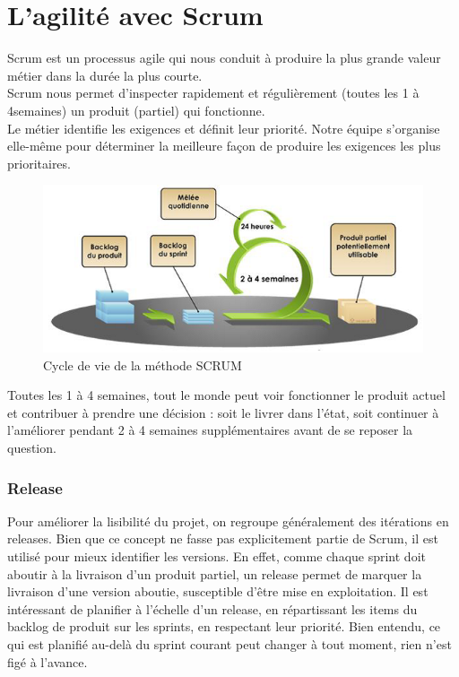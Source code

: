 \section{L’agilité avec Scrum}
Scrum est un processus agile qui nous conduit à produire la plus grande valeur métier dans la durée la plus courte.\\
Scrum nous permet d’inspecter rapidement et régulièrement (toutes les 1 à 4semaines) un produit
(partiel) qui fonctionne.\\
Le métier identifie les exigences et définit leur priorité. Notre équipe s’organise elle-même pour déterminer
la meilleure façon de produire les exigences les plus prioritaires.
\begin{figure}[h!]  
 \centering
    \includegraphics{annexe/Figures/scrum.png}
  \caption{Cycle de vie de la méthode SCRUM}
\end{figure}

Toutes les 1 à 4 semaines, tout le monde peut voir fonctionner le produit actuel et contribuer
à prendre une décision : soit le livrer dans l’état, soit continuer à l’améliorer pendant 2 à 4 semaines
supplémentaires avant de se reposer la question.\\

\subsubsection*{Release}
Pour améliorer la lisibilité du projet, on regroupe généralement des itérations en releases.
Bien que ce concept ne fasse pas explicitement partie de Scrum, il est utilisé pour mieux identifier
les versions. En effet, comme chaque sprint doit aboutir à la livraison d’un produit partiel, un release
permet de marquer la livraison d’une version aboutie, susceptible d’être mise en exploitation.
Il est intéressant de planifier à l’échelle d’un release, en répartissant les items du backlog de produit
sur les sprints, en respectant leur priorité. Bien entendu, ce qui est planifié au-delà du sprint courant
peut changer à tout moment, rien n’est figé à l’avance.\\
